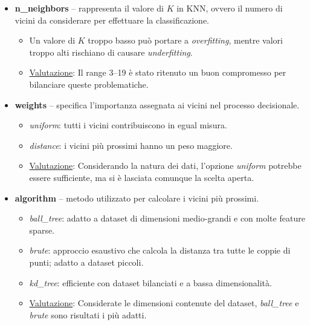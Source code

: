\documentclass{article}
\begin{document}
\begin{itemize}
    \item \textbf{n\_neighbors} -- rappresenta il valore di $K$ in KNN, ovvero il numero di vicini da considerare per effettuare la classificazione.
    \begin{itemize}
        \item Un valore di $K$ troppo basso può portare a \textit{overfitting}, mentre valori troppo alti rischiano di causare \textit{underfitting}.
        \item \underline{Valutazione}: Il range 3--19 è stato ritenuto un buon compromesso per bilanciare queste problematiche.
    \end{itemize}
    
    \item \textbf{weights} -- specifica l'importanza assegnata ai vicini nel processo decisionale.
    \begin{itemize}
        \item \textit{uniform}: tutti i vicini contribuiscono in egual misura.
        \item \textit{distance}: i vicini più prossimi hanno un peso maggiore.
        \item \underline{Valutazione}: Considerando la natura dei dati, l'opzione \textit{uniform} potrebbe essere sufficiente, ma si è lasciata comunque la scelta aperta.
    \end{itemize}
    
    \item \textbf{algorithm} -- metodo utilizzato per calcolare i vicini più prossimi.
    \begin{itemize}
        \item \textit{ball\_tree}: adatto a dataset di dimensioni medio-grandi e con molte feature sparse.
        \item \textit{brute}: approccio esaustivo che calcola la distanza tra tutte le coppie di punti; adatto a dataset piccoli.
        \item \textit{kd\_tree}: efficiente con dataset bilanciati e a bassa dimensionalità.
        \item \underline{Valutazione}: Considerate le dimensioni contenute del dataset, \textit{ball\_tree} e \textit{brute} sono risultati i più adatti.
    \end{itemize}
    

\end{itemize}
\end{document}
